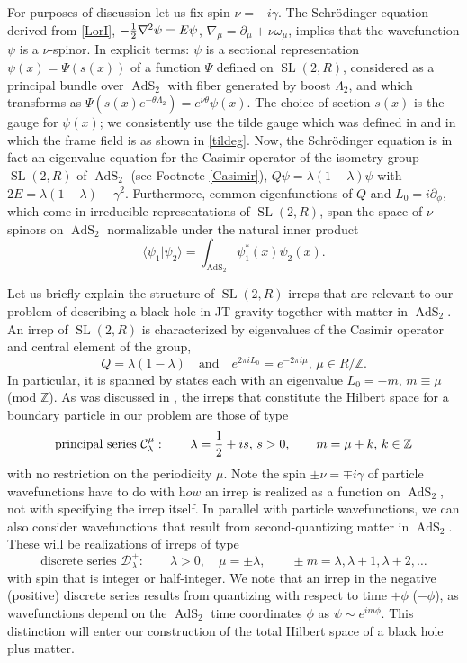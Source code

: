 \documentclass[12pt]{article}
\newcommand{\be}{\begin{equation}}
\newcommand{\ee}{\end{equation}}
\newcommand{\blangle}{\bigl\langle}
\newcommand{\brangle}{\bigr\rangle}
\newcommand*{\bbraket}[2]{\blangle{#1}\big|{#2}\brangle}
\newcommand{\calC}{\mathcal{C}}
\newcommand{\calD}{\mathcal{D}}
\newcommand{\ZZ}{\mathbb{Z}}
\newcommand{\RR}{\mathbb{R}}
\DeclareMathOperator{\tSL}{\widetilde{\mathrm{SL}}}
\DeclareMathOperator{\tAdS}{\widetilde{AdS}}
\newcommand{\tht}{\theta}
\newcommand{\lam}{\lambda}
\newcommand{\om}{\omega}
\newcommand{\ga}{\gamma}
\newcommand{\p}{\partial}
\def\widetilde#1{#1}%
\def\RR{R}
\begin{document}
 For purposes of discussion let us fix spin $\nu=-i\ga$. 
 The Schr\"{o}dinger equation derived from \eqref{LorI}, $-{1 \over 2}\nabla^2 \psi=E \psi$, $\nabla_{\mu}=\p_{\mu}+\nu \om_{\mu}$, implies that the wavefunction $\psi$ is a $\nu$-spinor. In explicit terms: $\psi$ is a sectional representation $\psi(x)=\Psi(s(x))$ of a function $\Psi$ defined on $\tSL(2,\RR)$, considered as a principal bundle over $\tAdS_2$ with fiber generated by boost $\Lambda_2$, and which transforms as $\Psi(s(x)e^{-\tht \Lambda_2})=e^{\nu\tht}\psi(x)$. The choice of section $s(x)$ is the gauge for $\psi(x)$; we consistently use the tilde gauge which was defined in \cite{KiSuh18} and in which the frame field is as shown in \eqref{tildeg}. Now, the Schr\"{o}dinger equation is in fact an eigenvalue equation for the Casimir operator of the isometry group $\tSL(2,\RR)$ of $\tAdS_2$ (see Footnote \ref{Casimir}), $Q\psi =\lambda(1-\lambda)\psi$ with $2E=\lambda(1-\lam) -\ga^2.$ Furthermore, common eigenfunctions of $Q$ and $L_0=i \p_{\phi}$, which come in irreducible representations of $\tSL(2,\RR)$, span the space of $\nu$-spinors on $\tAdS_2$ normalizable under the natural inner product 
 \begin{equation} \label{innprod}
\bbraket{\psi_1} {\psi_2}=\int_{\tAdS_2} \psi_1^*(x) \psi_2(x).
\end{equation}

Let us briefly explain the structure of $\tSL(2,\RR)$ irreps that are relevant to our problem of describing a black hole in JT gravity together with matter in $\tAdS_2$. An irrep of $\tSL(2,\RR)$ is characterized by eigenvalues of the Casimir operator and central element of the group, 
\be
Q=\lambda(1-\lam)\quad \text{and} \quad  e^{2\pi i L_0}=e^{-2\pi i \mu}, \,\mu \in \RR/\ZZ.
\ee
In particular, it is spanned by states each with an eigenvalue $L_0=-m$, $m \equiv \mu$ (mod $\ZZ$). As was discussed in \cite{KiSuh18}, the irreps that constitute the Hilbert space for a boundary particle in our problem are those of type
\be \label{prin}
\text{principal series $\calC_{\lambda}^{\mu}$}: \qquad \lambda={1 \over 2}+is,\, s>0, \qquad m=\mu+k ,\,  k \in \ZZ
\ee
with no restriction on the periodicity $\mu$. Note the spin $\pm \nu=\mp i \ga$ of particle wavefunctions have to do with $\textit{how}$ an irrep is realized as a function on $\tAdS_2$, not with specifying the irrep itself. In parallel with particle wavefunctions, we can also consider wavefunctions that result from second-quantizing matter in $\tAdS_2$. These will be realizations of irreps of type
\be \label{dis}
\text{discrete series } \calD^{\pm}_{\lam}: \qquad \lambda>0, \quad \mu=\pm \lambda, \qquad \pm m= \lambda, \lambda+1, \lambda+2,\dots
\ee
with spin that is integer or half-integer. We note that an irrep in the negative (positive) discrete series results from quantizing with respect to time $+\phi$ ($-\phi$), as wavefunctions depend on the $\tAdS_2$ time coordinates $\phi$ as $\psi \sim e^{im \phi}$. This distinction will enter our construction of the total Hilbert space of a black hole plus matter. 
\end{document}
